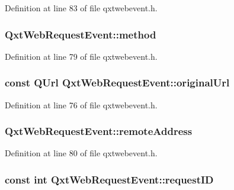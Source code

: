 Definition at line 83 of file qxtwebevent.\-h.

\hypertarget{class_qxt_web_request_event_ae8871184cd34444c8bbc76fd58f46333}{
\subsubsection[{method}]{ Qxt\-Web\-Request\-Event\-::method}}\label{class_qxt_web_request_event_ae8871184cd34444c8bbc76fd58f46333}


Definition at line 79 of file qxtwebevent.\-h.

\hypertarget{class_qxt_web_request_event_a0a4ad2f21fe52a1559508b1df842f540}{
\subsubsection[{original\-Url}]{\setlength{\rightskip}{0pt plus 5cm}const Q\-Url Qxt\-Web\-Request\-Event\-::original\-Url}}\label{class_qxt_web_request_event_a0a4ad2f21fe52a1559508b1df842f540}


Definition at line 76 of file qxtwebevent.\-h.

\hypertarget{class_qxt_web_request_event_a730040f4ccb8843787bd590f1de6f047}{
\subsubsection[{remote\-Address}]{ Qxt\-Web\-Request\-Event\-::remote\-Address}}\label{class_qxt_web_request_event_a730040f4ccb8843787bd590f1de6f047}


Definition at line 80 of file qxtwebevent.\-h.

\hypertarget{class_qxt_web_request_event_a79e20dd1cbc06f8cf1abe47bf6360277}{
\subsubsection[{request\-I\-D}]{\setlength{\rightskip}{0pt plus 5cm}const {\bf int} Qxt\-Web\-Request\-Event\-::request\-I\-D}}\label{class_qxt_web_request_event_a79e20dd1cbc06f8cf1abe47bf6360277}


